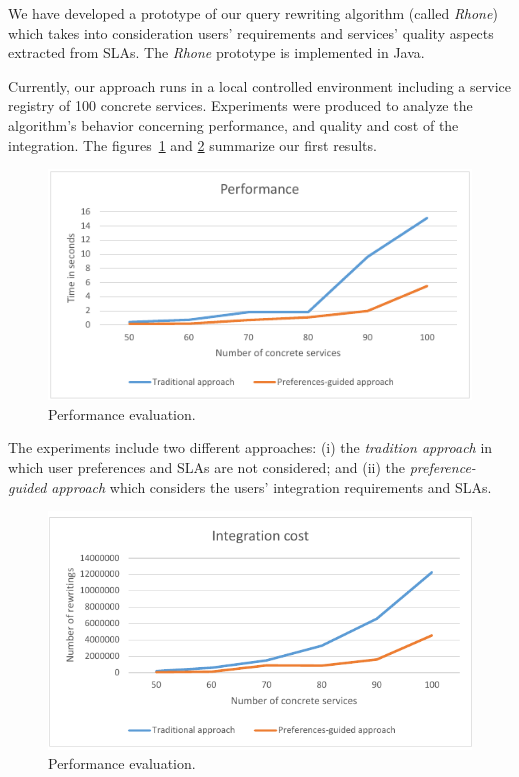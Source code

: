 We have developed a prototype of our query rewriting algorithm (called \textit{Rhone}) which takes into consideration users' requirements and services' quality aspects extracted from SLAs.
The \textit{Rhone} prototype is implemented in Java.

Currently, our approach runs in a local controlled environment including a service registry of 100 concrete services. 
Experiments were produced to analyze the algorithm's behavior concerning performance, and quality and cost of the integration. The figures~\ref{fig01} and \ref{fig02} summarize our first results.

\begin{figure}[!h]
\centering
\includegraphics[scale=0.8]{fig1.pdf}
\caption{Performance evaluation.}\label{fig01}
\end{figure} 

The experiments include two different approaches: (i) the \textit{tradition approach} in which user preferences and SLAs are not considered; and (ii) the \textit{preference-guided approach} which considers the users' integration requirements and SLAs.

\begin{figure}[!h]
\centering
\includegraphics[scale=0.8]{fig2.pdf}
\caption{Performance evaluation.}\label{fig02}
\end{figure} 

